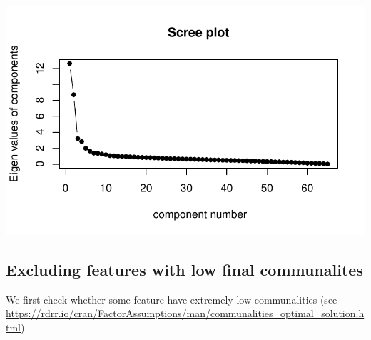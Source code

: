 \documentclass[
  letterpaper,
  DIV=11,
  numbers=noendperiod]{scrreprt}
\newenvironment{Shaded}{\begin{snugshade}}{\end{snugshade}}
\newcommand{\AttributeTok}[1]{\textcolor[rgb]{0.40,0.45,0.13}{#1}}
\newcommand{\CommentTok}[1]{\textcolor[rgb]{0.37,0.37,0.37}{#1}}
\newcommand{\DecValTok}[1]{\textcolor[rgb]{0.68,0.00,0.00}{#1}}
\newcommand{\FunctionTok}[1]{\textcolor[rgb]{0.28,0.35,0.67}{#1}}
\newcommand{\NormalTok}[1]{\textcolor[rgb]{0.00,0.23,0.31}{#1}}
\newcommand{\OtherTok}[1]{\textcolor[rgb]{0.00,0.23,0.31}{#1}}
\newcommand{\SpecialCharTok}[1]{\textcolor[rgb]{0.37,0.37,0.37}{#1}}
\newcommand{\StringTok}[1]{\textcolor[rgb]{0.13,0.47,0.30}{#1}}
\begin{document}
\includegraphics{AppendixF_files/figure-pdf/screeplot-1.pdf}

\begin{Shaded}
\end{Shaded}

\subsection{Excluding features with low final
communalites}\label{excluding-features-with-low-final-communalites}

We first check whether some feature have extremely low communalities
(see
\href{https://rdrr.io/cran/FactorAssumptions/man/communalities_optimal_solution.htmlhttps://rdrr.io/cran/FactorAssumptions/man/communalities_optimal_solution.html}{https://rdrr.io/cran/FactorAssumptions/man/communalities\_optimal\_solution.html}).
\end{document}
